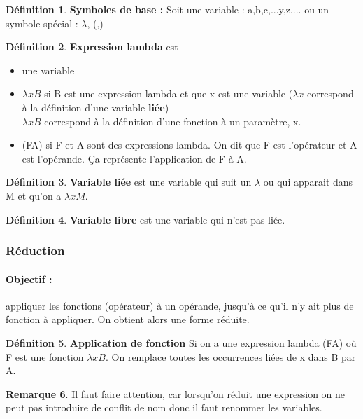 \documentclass[11pt,a4paper]{article}
\theoremstyle{definition}
\newtheorem{mydef}{Définition}
\newtheorem{myrem}[mydef]{Remarque}
\begin{document}
\begin{mydef}
	\textbf{Symboles de base :} Soit une variable : a,b,c,...y,z,... ou un 
	symbole spécial : $\lambda$, (,)
\end{mydef}

\begin{mydef}
	\textbf{Expression lambda} est
	\begin{itemize}
		\item une variable
		\item $\lambda xB$ si B est une expression lambda et que x est 
			une variable ($\lambda x$ correspond à la définition 
			d'une variable \textbf{liée}) \\
			$\lambda xB$ correspond à la définition d'une fonction 
			à un paramètre, x.
		\item (FA) si F et A sont des expressions lambda. On dit que F 
			est l'opérateur et A est l'opérande. Ça représente 
			l'application de F à A.
	\end{itemize}
\end{mydef}

\begin{mydef}
	\textbf{Variable liée} est une variable qui suit un $\lambda$ ou qui 
	apparait dans M et qu'on a $\lambda xM$. 
\end{mydef}

\begin{mydef}
	\textbf{Variable libre} est une variable qui n'est pas liée.
\end{mydef}

\subsubsection{Réduction}

\paragraph{Objectif :} appliquer les fonctions (opérateur) à un opérande, 
jusqu'à ce qu'il n'y ait plus de fonction à appliquer. On obtient alors une 
forme réduite.

\begin{mydef}
	\textbf{Application de fonction} Si on a une expression lambda (FA) où 
	F est une fonction $\lambda xB$. On remplace toutes les occurrences liées 
	de x dans B par A.
\end{mydef}

\begin{myrem}
	Il faut faire attention, car lorsqu'on réduit une expression on ne peut 
	pas introduire de conflit de nom donc il faut renommer les variables.
\end{myrem}
\end{document}
